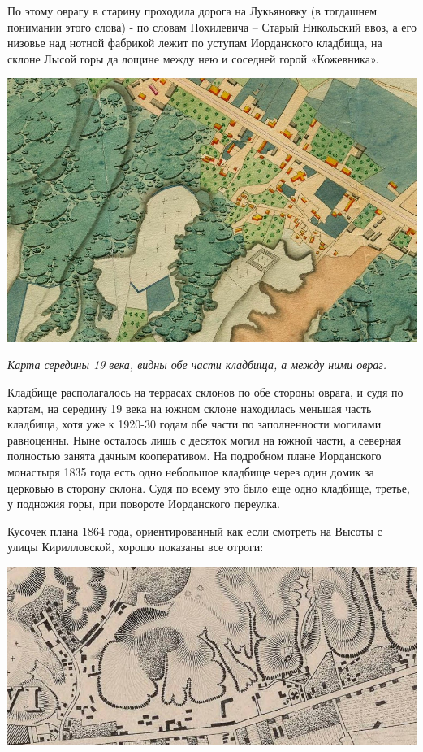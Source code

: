 По этому оврагу в старину проходила дорога на Лукьяновку (в тогдашнем понимании этого слова) - по словам Похилевича – Старый Никольский ввоз, а его низовье над нотной фабрикой лежит по уступам Иорданского кладбища, на склоне Лысой горы да лощине между нею и соседней горой «Кожевника».

\begin{center}
\includegraphics[width=\linewidth]{chast-kirvys/lys02/kladb-1850.jpg}

\textit{Карта середины 19 века, видны обе части кладбища, а между ними овраг.}
\end{center}


Кладбище располагалось на террасах склонов по обе стороны оврага, и судя по картам, на середину 19 века на южном склоне находилась меньшая часть кладбища, хотя уже к 1920-30 годам обе части по заполненности могилами равноценны. Ныне осталось лишь с десяток могил на южной части, а северная полностью занята дачным кооперативом. На подробном плане Иорданского монастыря 1835 года есть одно небольшое кладбище через один домик за церковью в сторону склона. Судя по всему это было еще одно кладбище, третье, у подножия горы, при повороте Иорданского переулка.

Кусочек плана 1864 года, ориентированный как если смотреть на Высоты с улицы Кирилловской, хорошо показаны все отроги:

\begin{center}
\includegraphics[width=\linewidth]{chast-kirvys/lys02/1846-y.jpg}
\end{center}

